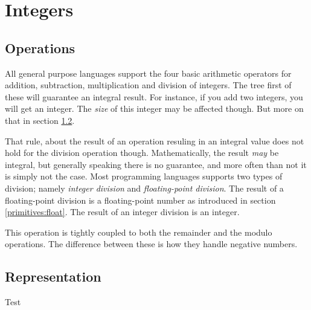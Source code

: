 \section{Integers}

\subsection{Operations}

All general purpose languages support the four basic arithmetic operators for addition, subtraction, multiplication and division of integers. The tree first of these will guarantee an integral result. For instance, if you add two integers, you will get an integer. The \textsl{size} of this integer may be affected though. But more on that in section \ref{primitives:int:representation}.

That rule, about the result of an operation resuling in an integral value does not hold for the division operation though. Mathematically, the result \textsl{may} be integral, but generally speaking there is no guarantee, and more often than not it is simply not the case. Most programming languages supports two types of division; namely \textsl{integer division} and \textsl{floating-point division}. The result of a floating-point division is a floating-point number as introduced in section \ref{primitives:float}. The result of an integer division is an integer.

This operation is tightly coupled to both the remainder and the modulo operations. The difference between these is how they handle negative numbers.


\subsection{Representation}
\label{primitives:int:representation}



\csharpsubsection{\csharp}

\begin{syntaxsegment}
  Test
\end{syntaxsegment}


